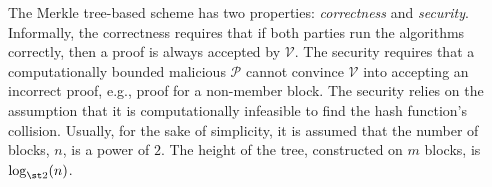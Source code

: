 The Merkle tree-based scheme has two properties: \emph{correctness} and \emph{security}. Informally, the correctness requires that if both parties run the algorithms correctly, then a proof is always accepted by  $\mathcal{V}$. The security requires that a computationally bounded malicious $\mathcal{P}$ cannot convince  $\mathcal{V}$ into accepting an incorrect proof, e.g., proof for a non-member block. The security relies on the assumption that it is computationally infeasible to find the hash function's collision. Usually, for the sake of simplicity, it is assumed that the number of blocks, $n$, is a power of $2$. The height of the tree, constructed on $m$ blocks, is $\log_{\st 2}(n)$. 